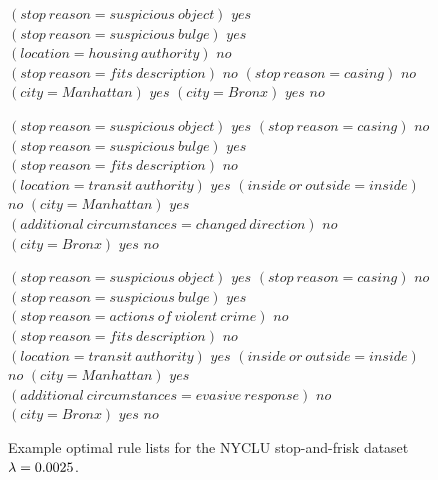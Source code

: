 \begin{figure}[h!]
\begin{algorithmic}
\State \belif $(stop~reason = suspicious~object)$ \bthen $yes$
\State \belif $(stop~reason = suspicious~bulge)$ \bthen $yes$
\State \belif $(location = housing~authority)$ \bthen $no$
\State \belif $(stop~reason = fits~description)$ \bthen $no$
\State \belif $(stop~reason = casing)$ \bthen $no$
\State \belif $(city = Manhattan)$ \bthen $yes$
\State \belif $(city = Bronx)$ \bthen $yes$
\State \belse $no$
\end{algorithmic}
\vspace{0.5mm}
\begin{algorithmic}
\State \bif $(stop~reason = suspicious~object)$ \bthen $yes$ 
\State \belif $(stop~reason = casing)$ \bthen $no$
\State \belif $(stop~reason = suspicious~bulge)$ \bthen $yes$
\State \belif $(stop~reason = fits~description)$ \bthen $no$
\State \belif $(location = transit~authority)$ \bthen $yes$
\State \belif $(inside~or~outside = inside)$ \bthen $no$
\State \belif $(city = Manhattan)$ \bthen $yes$
\State \belif $(additional~circumstances = changed~direction)$ \bthen $no$
\State \belif $(city = Bronx)$ \bthen $yes$
\State \belse $no$
\end{algorithmic}
\vspace{0.5mm}
\begin{algorithmic}
\State \bif $(stop~reason = suspicious~object)$ \bthen $yes$ 
\State \belif $(stop~reason = casing)$ \bthen $no$
\State \belif $(stop~reason = suspicious~bulge)$ \bthen $yes$
\State \belif $(stop~reason = actions~of~violent~crime)$ \bthen $no$
\State \belif $(stop~reason = fits~description)$ \bthen $no$
\State \belif $(location = transit~authority)$ \bthen $yes$
\State \belif $(inside~or~outside = inside)$ \bthen $no$
\State \belif $(city = Manhattan)$ \bthen $yes$
\State \belif $(additional~circumstances = evasive~response)$ \bthen $no$
\State \belif $(city = Bronx)$ \bthen $yes$
\State \belse $no$
\end{algorithmic}
\caption{Example optimal rule lists for the NYCLU stop-and-frisk dataset~${{\lambda} = 0.0025}$.
}
\label{fig:weapon-rule-list-0025}
\end{figure}
